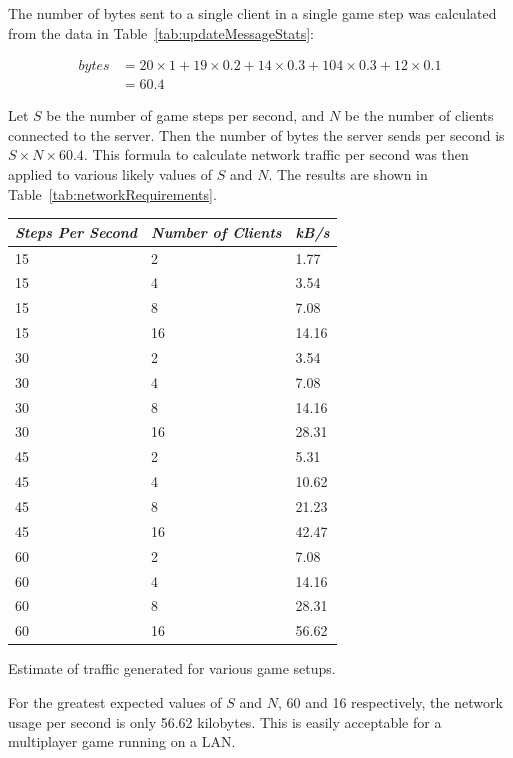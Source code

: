 The number of bytes sent to a single client in a single game step was calculated from the data in Table~\ref{tab:updateMessageStats}:

\begin{align*}
bytes &= 20 \times 1 + 19 \times 0.2 + 14 \times 0.3 + 104 \times 0.3 + 12 \times 0.1 \\
      &= 60.4
\end{align*}

Let $S$ be the number of game steps per second, and $N$ be the number of clients connected to the server. Then the number of bytes the server sends per second is $S \times N \times 60.4$. This formula to calculate network traffic per second was then applied to various likely values of $S$ and $N$. The results are shown in Table~\ref{tab:networkRequirements}.

\begin{margintable}
    \begin{tabular}{p{5em} p{5em} p{5em}}
    \toprule
    \emph{Steps Per Second} & \emph{Number of Clients} & \emph{kB/s} \\
    \midrule
    15 & 2 & 1.77 \\
    15 & 4 & 3.54 \\
    15 & 8 & 7.08 \\
    15 & 16 & 14.16 \\
    30 & 2 & 3.54 \\
    30 & 4 & 7.08 \\
    30 & 8 & 14.16 \\
    30 & 16 & 28.31 \\
    45 & 2 & 5.31 \\
    45 & 4 & 10.62 \\
    45 & 8 & 21.23 \\
    45 & 16 & 42.47 \\
    60 & 2 & 7.08 \\
    60 & 4 & 14.16 \\
    60 & 8 & 28.31 \\
    60 & 16 & 56.62 \\
    \bottomrule
    \end{tabular}
    	\vspace{1em}
	\caption[Estimation of network requirements]{
	Estimate of traffic generated for various game setups.}
	\label{tab:networkRequirements}
\end{margintable}

For the greatest expected values of $S$ and $N$, 60 and 16 respectively, the network usage per second is only 56.62 kilobytes. This is easily acceptable for a multiplayer game running on a LAN.


